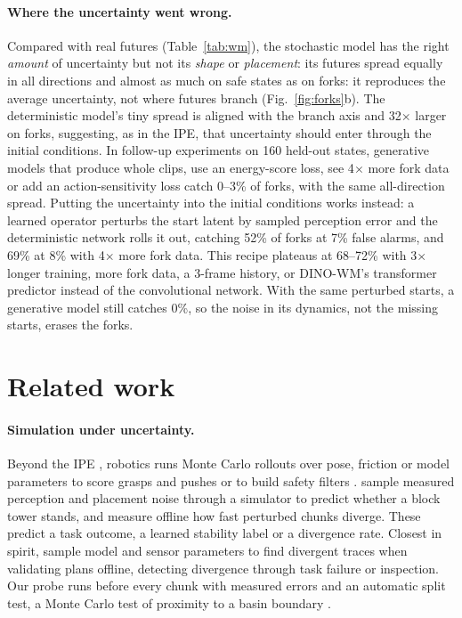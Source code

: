 \documentclass{article}
\begin{document}
\paragraph{Where the uncertainty went wrong.} Compared with real futures (Table~\ref{tab:wm}), the stochastic model has the right \emph{amount} of uncertainty but not its \emph{shape} or \emph{placement}:
its futures spread equally in all directions and almost as much on safe states as on forks: it
reproduces the average uncertainty, not where futures branch (Fig.~\ref{fig:forks}b). The deterministic model's tiny spread is aligned with the branch axis and 32$\times$ larger on
forks, suggesting, as in the IPE, that uncertainty should enter through the initial conditions. In
follow-up experiments on 160 held-out states, generative models that produce whole
clips, use an energy-score loss, see 4$\times$ more fork data or add an action-sensitivity loss catch
0--3\% of forks, with the same all-direction spread. Putting the uncertainty into the initial conditions
works instead: a learned operator perturbs the start latent by sampled perception error and the
deterministic network rolls it out, catching 52\% of forks at 7\% false alarms, and 69\% at 8\% with
4$\times$ more fork data. This recipe plateaus at 68--72\% with 3$\times$ longer training, more fork
data, a 3-frame history, or DINO-WM's transformer predictor \citep{zhou2025dinowm} instead of the
convolutional network. With the same perturbed starts, a generative model still catches 0\%, so the
noise in its dynamics, not the missing starts, erases the forks.

\section{Related work}
\paragraph{Simulation under uncertainty.} Beyond the IPE \citep{zhou2023mental}, robotics runs Monte Carlo rollouts over pose, friction or model parameters to
score grasps and pushes \citep{mahler2017dexnet,agboh2018pushing} or to build safety filters
\citep{johansson2025safety,wang2026manidreams}. \citet{cannizzaro2024cobra} sample measured perception
and placement noise through a simulator to predict whether a block tower stands, and
\citet{goyal2026stability} measure offline how fast perturbed chunks diverge. These
predict a task outcome, a learned stability label \citep{lerer2016learning} or a divergence rate. Closest in spirit,
\citet{zapolsky2016particle} sample model and sensor parameters to find divergent traces when validating
plans offline, detecting divergence through task failure or inspection. Our probe runs before every
chunk with measured errors and an automatic split test, a Monte Carlo test of proximity to a basin
boundary \citep{menck2013basin}.
\end{document}

